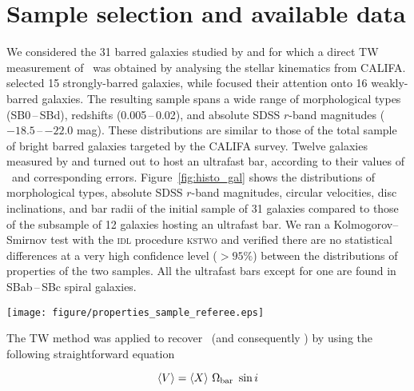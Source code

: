 \documentclass{aa}
\begin{document}
\section{Sample selection and available data}
\label{sec:method_sample}

We considered the 31 barred galaxies studied by \citet{Aguerri2015} and \citet{Cuomo2019b} for which a direct TW measurement of \omegabar\ was obtained by analysing the stellar kinematics from CALIFA. \citet{Aguerri2015} selected 15 strongly-barred galaxies, while \citet{Cuomo2019b} focused their attention onto 16 weakly-barred galaxies. The resulting sample spans a wide range of morphological types (SB0\,--\,SBd), redshifts (0.005\,--\,0.02), and absolute SDSS $r$-band magnitudes ($-18.5$\,--\,$-22.0$ mag). These distributions are similar to those of the total sample of bright barred galaxies targeted by the CALIFA survey. Twelve galaxies measured by \citet{Aguerri2015} and \citet{Cuomo2019b} turned out to host an ultrafast bar, according to their values of \rr\ and corresponding errors. Figure~\ref{fig:histo_gal} shows the distributions of morphological types, absolute SDSS $r$-band magnitudes, circular velocities, disc inclinations, and bar radii of the initial sample of 31 galaxies compared to those of the subsample of 12 galaxies hosting an ultrafast bar. We ran a Kolmogorov–Smirnov test with the \textsc{idl} procedure \textsc{kstwo} and verified there are no statistical differences at a very high confidence level ($>95\%$) between the distributions of properties of the two samples. All the ultrafast bars except for one are found in SBab\,--\,SBc spiral galaxies.

\begin{figure*}
    \centering
    \texttt{[image: figure/properties\_sample\_referee.eps]}
    \caption{Distribution of the morphological types, absolute SDSS $r$-band magnitudes, circular velocities, disc inclinations and bar radii of the initial sample of 31 CALIFA galaxies analysed with the TW method by \cite{Aguerri2015} and \cite{Cuomo2019b} (black solid line) and of the subsample of 12 galaxies hosting an ultrafast bar discussed in this paper (red dotted line).}
    \label{fig:histo_gal}
\end{figure*}

The TW method was applied to recover \omegabar\ (and consequently \rr) by using the following straightforward equation

\begin{equation}
\langle V \rangle = \langle X \rangle ~\Omega_{\rm bar}~\sin i
\end{equation}
\end{document}
